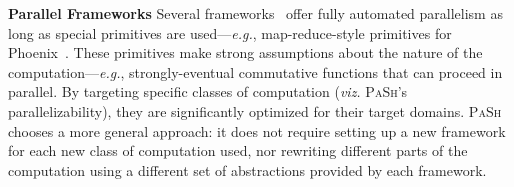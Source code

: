 \documentclass[sigplan, review, screen, anonymous]{acmart}
\newcommand{\eg}{{\em e.g.}, }
\newcommand{\heading}[1]{\vspace{4pt}\noindent\textbf{#1}\enspace}
\newcommand{\kk}[1]{[{\color{magenta}kk: #1}]}
\newcommand{\sys}{{\scshape PaSh}\xspace}
\begin{document}
\heading{Parallel Frameworks}
Several frameworks~\cite{streamit:02, brook:04, phoenix:11, raftlib:17} offer fully automated parallelism as long as special primitives are used---\eg map-reduce-style primitives for Phoenix~\cite{phoenix:11}.
These primitives make strong assumptions about the nature of the computation---\eg strongly-eventual commutative functions that can proceed in parallel.
By targeting specific classes of computation (\emph{viz.} \sys's parallelizability), they are significantly optimized for their target domains.
\sys chooses a more general approach:
   it does not require setting up a new framework for each new class of computation used, nor rewriting different parts of the computation using a different set of abstractions provided by each framework.


% 
% 
\end{document}
